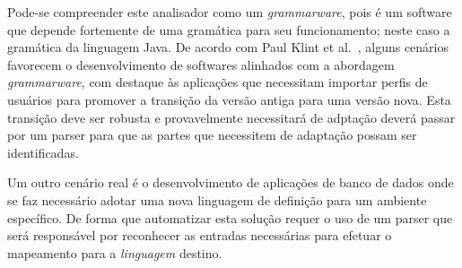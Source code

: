 Pode-se compreender este analisador como um \emph{grammarware}, pois \'{e} um software 
que depende fortemente de uma gram\'{a}tica para seu funcionamento; neste caso a gram\'{a}tica da linguagem Java. 
De acordo com Paul Klint et al.~\cite{klint2005toward}, alguns cen\'{a}rios favorecem o desenvolvimento de softwares alinhados com a abordagem 
\emph{grammarware}, com destaque \`{a}s aplicaç\~{o}es que necessitam importar perfis de usu\'{a}rios para promover a transiç\~{a}o da vers\~{a}o 
antiga para uma vers\~{a}o nova. 
Esta transiç\~{a}o deve ser robusta e provavelmente necessitar\'{a} de adptaç\~{a}o dever\'{a} passar 
por um parser para que as partes que necessitem de adaptaç\~{a}o possam ser identificadas.

Um outro cen\'{a}rio real \'{e} o desenvolvimento de aplicaç\~{o}es de banco de dados onde se faz necess\'{a}rio adotar 
uma nova linguagem de definiç\~{a}o para um ambiente espec\'{i}fico. De forma que automatizar esta soluç\~{a}o requer o uso de um 
parser que ser\'{a} respons\'{a}vel por reconhecer as entradas necess\'{a}rias para efetuar o mapeamento 
para a \emph{linguagem} destino.








